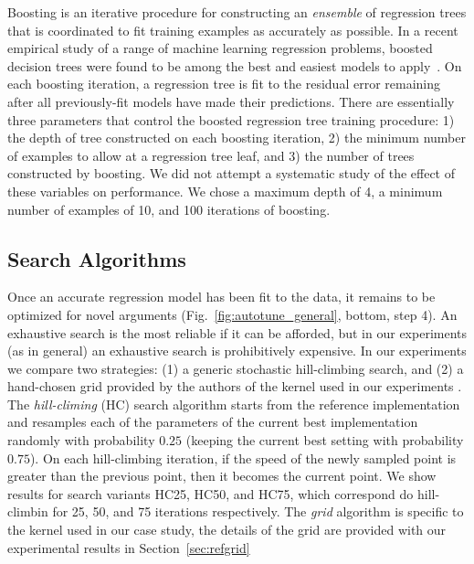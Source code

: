 \documentclass{sig-alternate}
\begin{document}
Boosting is an iterative procedure for constructing an {\em ensemble} of regression trees that is coordinated to fit training examples as accurately as possible.
\citep{schapire:2001,friedman:2002}
In a recent empirical study of a range of machine learning regression problems,
boosted decision trees were found to be among the best and easiest models to
apply~\citep{caruana+niculescu-mizil:2006}.
On each boosting iteration, a regression tree is fit to the residual error remaining
after all previously-fit models have made their predictions.
There are essentially three parameters that control the boosted regression tree
training procedure:
1) the depth of tree constructed on each boosting iteration,
2) the minimum number of examples to allow at a regression tree leaf, and
3) the number of trees constructed by boosting.
We did not attempt a systematic study of the effect of these variables on performance.
We chose a maximum depth of 4,
a minimum number of examples of 10,
and 100 iterations of boosting.

\subsection{Search Algorithms}

Once an accurate regression model has been fit to the data, it remains to be optimized for novel arguments (Fig.~\ref{fig:autotune_general}, bottom, step 4).
An exhaustive search is the most reliable if it can be afforded, but in our experiments
(as in general) an exhaustive search is prohibitively expensive.
In our experiments we compare two strategies:
(1)
a generic stochastic hill-climbing search,
and (2)
a hand-chosen grid provided by the authors of the kernel used in our experiments \citep{pinto+cox:2011gcg}.
The {\em hill-climing} (HC) search algorithm starts from the reference
implementation and resamples each of the parameters
of the current best implementation randomly with
probability $0.25$ (keeping the current best setting with probability $0.75$).
On each hill-climbing iteration, if the speed of the newly sampled point is greater than the previous point, then it becomes the current point.
We show results for search variants HC25, HC50, and HC75, which correspond do hill-climbin for 25, 50, and 75 iterations respectively.
The {\em grid} algorithm is specific to the kernel used in our case study,
the details of the grid are provided with our experimental results in Section~\ref{sec:refgrid}

\end{document}

